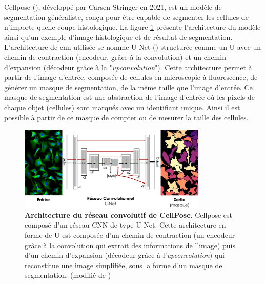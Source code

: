 Cellpose (\cite{stringer_cellpose_2021}), développé par Carsen Stringer en 2021, est un modèle de segmentation généraliste, conçu pour être capable de segmenter les cellules de n'importe quelle coupe histologique. La figure \ref{fig:cellpose_archi} présente l'architecture du modèle ainsi qu'un exemple d'image histologique et de résultat de segmentation. L'architecture de \gls{cnn} utilisée se nomme U-Net (\cite{ronneberger_u-net_2015}) structurée comme un U avec un chemin de contraction (encodeur, grâce à la convolution) et un chemin d'expansion (décodeur grâce à la "\textit{upconvolution}"). Cette architecture permet à partir de l'image d'entrée, composée de cellules en microscopie à fluorescence, de générer un masque de segmentation, de la même taille que l'image d'entrée. Ce masque de segmentation est une abstraction de l'image d'entrée où les pixels de chaque objet (cellules) sont marqués avec un identifiant unique. Ainsi il est possible à partir de ce masque de compter ou de mesurer la taille des cellules.
\begin{figure}[!htbp]
 \centering
 \includegraphics[width=0.8\textwidth]{figures/cellpose_archi.png}
 \caption[Architecture du réseau convolutionel de CellPose]{\textbf{Architecture du réseau convolutif de CellPose}. Cellpose est composé d'un réseau CNN de type U-Net. Cette architecture en forme de U est composée d'un chemin de contraction (un encodeur grâce à la convolution qui extrait des informations de l'image) puis d'un chemin d'expansion (décodeur grâce à l'\textit{upconvolution}) qui reconstitue une image simplifiée, sous la forme d'un masque de segmentation. (modifié de \cite{stringer_cellpose_2021})}
 \label{fig:cellpose_archi}
\end{figure}
